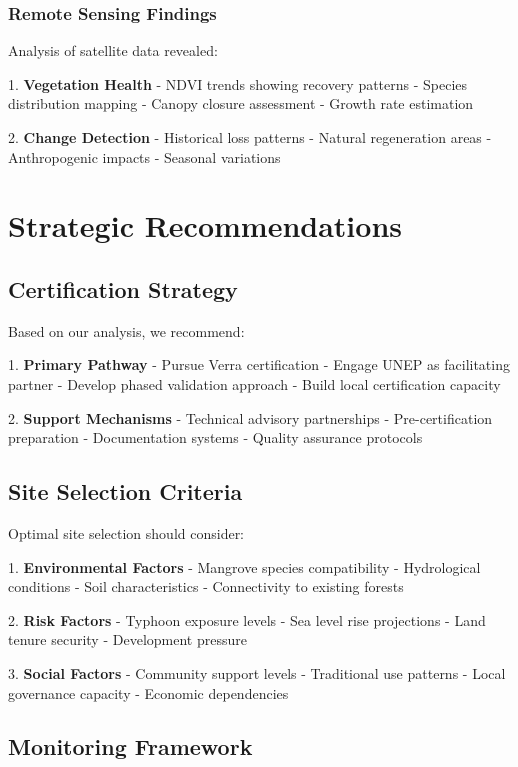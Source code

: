\documentclass{article}
\theoremstyle{plain}
\theoremstyle{definition}
\theoremstyle{remark}
\begin{document}
\begin{multicols}{2}
\subsubsection{Remote Sensing Findings}
Analysis of satellite data revealed:

1. \textbf{Vegetation Health}
   - NDVI trends showing recovery patterns
   - Species distribution mapping
   - Canopy closure assessment
   - Growth rate estimation

2. \textbf{Change Detection}
   - Historical loss patterns
   - Natural regeneration areas
   - Anthropogenic impacts
   - Seasonal variations

\section{Strategic Recommendations}

\subsection{Certification Strategy}
Based on our analysis, we recommend:

1. \textbf{Primary Pathway}
   - Pursue Verra certification
   - Engage UNEP as facilitating partner
   - Develop phased validation approach
   - Build local certification capacity

2. \textbf{Support Mechanisms}
   - Technical advisory partnerships
   - Pre-certification preparation
   - Documentation systems
   - Quality assurance protocols

\subsection{Site Selection Criteria}
Optimal site selection should consider:

1. \textbf{Environmental Factors}
   - Mangrove species compatibility
   - Hydrological conditions
   - Soil characteristics
   - Connectivity to existing forests

2. \textbf{Risk Factors}
   - Typhoon exposure levels
   - Sea level rise projections
   - Land tenure security
   - Development pressure

3. \textbf{Social Factors}
   - Community support levels
   - Traditional use patterns
   - Local governance capacity
   - Economic dependencies

\subsection{Monitoring Framework}


\end{multicols}
\end{document}
